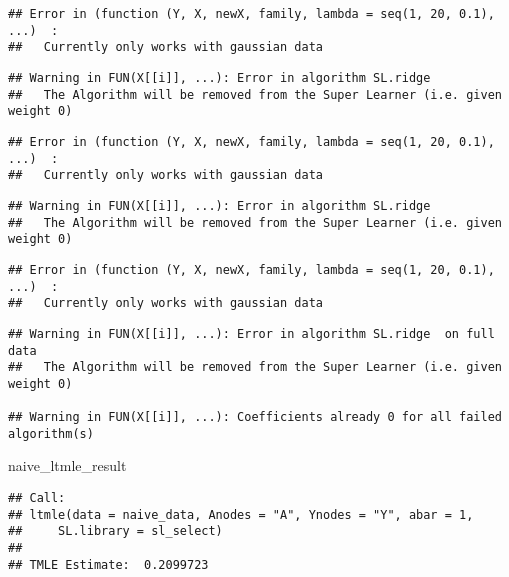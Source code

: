 \documentclass[
]{article}
\newenvironment{Shaded}{\begin{snugshade}}{\end{snugshade}}
\newcommand{\NormalTok}[1]{#1}
\begin{document}
\begin{verbatim}
## Error in (function (Y, X, newX, family, lambda = seq(1, 20, 0.1), ...)  : 
##   Currently only works with gaussian data
\end{verbatim}

\begin{verbatim}
## Warning in FUN(X[[i]], ...): Error in algorithm SL.ridge 
##   The Algorithm will be removed from the Super Learner (i.e. given weight 0)
\end{verbatim}

\begin{verbatim}
## Error in (function (Y, X, newX, family, lambda = seq(1, 20, 0.1), ...)  : 
##   Currently only works with gaussian data
\end{verbatim}

\begin{verbatim}
## Warning in FUN(X[[i]], ...): Error in algorithm SL.ridge 
##   The Algorithm will be removed from the Super Learner (i.e. given weight 0)
\end{verbatim}

\begin{verbatim}
## Error in (function (Y, X, newX, family, lambda = seq(1, 20, 0.1), ...)  : 
##   Currently only works with gaussian data
\end{verbatim}

\begin{verbatim}
## Warning in FUN(X[[i]], ...): Error in algorithm SL.ridge  on full data 
##   The Algorithm will be removed from the Super Learner (i.e. given weight 0)

## Warning in FUN(X[[i]], ...): Coefficients already 0 for all failed algorithm(s)
\end{verbatim}

\begin{Shaded}
\begin{Highlighting}[]
\NormalTok{naive\_ltmle\_result}
\end{Highlighting}
\end{Shaded}

\begin{verbatim}
## Call:
## ltmle(data = naive_data, Anodes = "A", Ynodes = "Y", abar = 1, 
##     SL.library = sl_select)
## 
## TMLE Estimate:  0.2099723
\end{verbatim}
\end{document}
